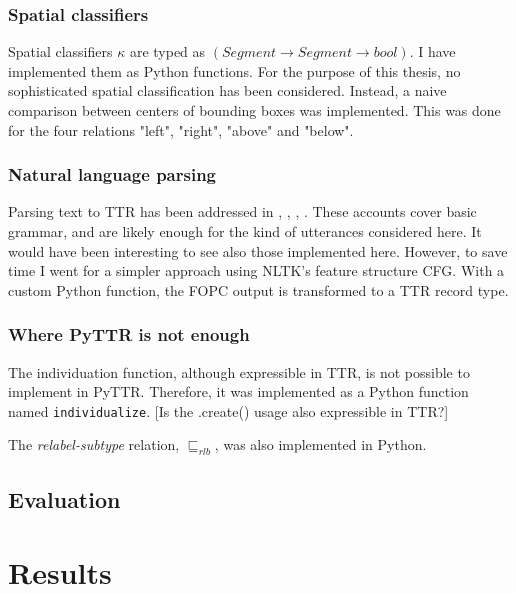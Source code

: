 \documentclass[11pt, a4paper]{article}
\begin{document}
\subsubsection{Spatial classifiers}

Spatial classifiers $\kappa$ are typed as $(Segment \rightarrow Segment \rightarrow bool)$.
I have implemented them as Python functions.
For the purpose of this thesis, no sophisticated spatial classification has been considered.
Instead, a naive comparison between centers of bounding boxes was implemented.
This was done for the four relations "left", "right", "above" and "below".



\subsubsection{Natural language parsing}

Parsing text to TTR has been addressed in \cite{CooperRecordsRecordTypes2005}, \cite{RobinCooperAustiniantruthattitudes2005}, \cite{CooperTypetheorysemantics2012}, \cite{CooperTypetheorylanguage2016}.
These accounts cover basic grammar, and are likely enough for the kind of utterances considered here.
It would have been interesting to see also those implemented here.
However, to save time I went for a simpler approach using NLTK's feature structure CFG.
With a custom Python function, the FOPC output is transformed to a TTR record type.



\subsubsection{Where PyTTR is not enough}

The individuation function, although expressible in TTR, is not possible to implement in PyTTR.
Therefore, it was implemented as a Python function named {\tt individualize}.
[Is the .create() usage also expressible in TTR?]

The \textit{relabel-subtype} relation, $\sqsubseteq_{rlb}$, was also implemented in Python.



\subsection{Evaluation}



\section{Results}
\label{sec:results}
\end{document}
